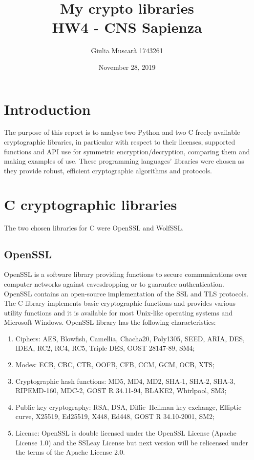 \documentclass[11 pt]{article}
\title{
	My crypto libraries \\
	\large HW4 - CNS Sapienza}
\author{Giulia Muscarà 1743261}
\date{November 28, 2019}
\begin{document}
\maketitle

\section{Introduction}
The purpose of this report is to analyse two  Python and two C freely available cryptographic libraries, in particular with respect to their licenses, supported functions and API use for symmetric encryption/decryption, comparing them and making examples of use. These programming languages' libraries were chosen as they provide robust, efficient cryptographic algorithms and protocols.
 
\section{C cryptographic libraries}
The two chosen libraries for C were OpenSSL and WolfSSL.

\subsection{OpenSSL} 
OpenSSL is a software library providing functions to secure communications over computer networks against eavesdropping or to guarantee authentication. OpenSSL contains an open-source implementation of the SSL and TLS protocols. The C library  implements basic cryptographic functions and provides various utility functions and it is available for most Unix-like operating systems and Microsoft Windows. OpenSSL library has the following characteristics:
\begin{enumerate}
	\item Ciphers: AES, Blowfish, Camellia, Chacha20, Poly1305, SEED, ARIA, DES, IDEA, RC2, RC4, RC5, Triple DES, GOST 28147-89, SM4;
	\item Modes: ECB, CBC, CTR, OOFB, CFB, CCM, GCM, OCB, XTS;
	\item Cryptographic hash functions: MD5, MD4, MD2, SHA-1, SHA-2, SHA-3, RIPEMD-160, MDC-2, GOST R 34.11-94, BLAKE2, Whirlpool, SM3;
	\item Public-key cryptography: RSA, DSA, Diffie–Hellman key exchange, Elliptic curve, X25519, Ed25519, X448, Ed448, GOST R 34.10-2001, SM2;
	\item License: OpenSSL is double licensed under the OpenSSL License (Apache License 1.0) and the SSLeay License but next version will be relicensed under the terms of the Apache License 2.0.
\end{enumerate}
\end{document}

